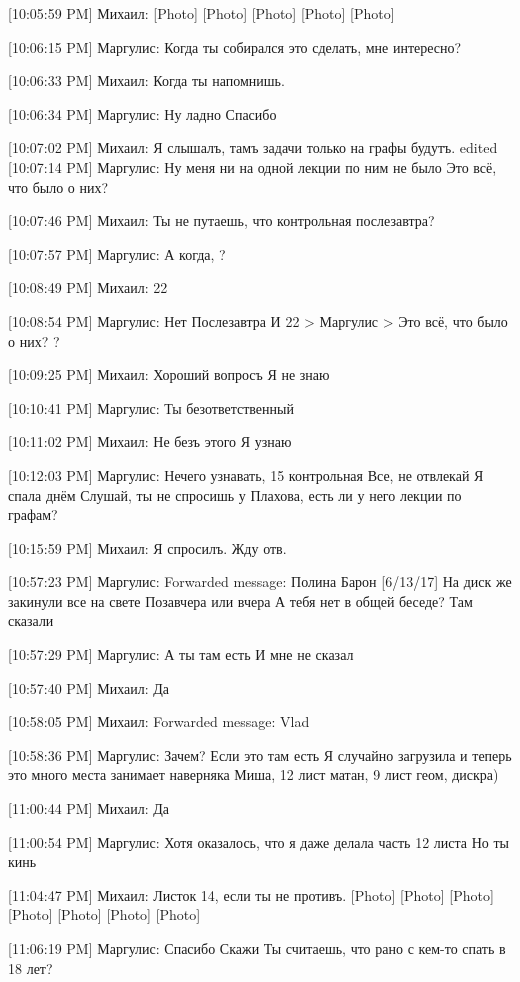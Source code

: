 \documentclass{article}
\newcommand{\yat}{{\fontencoding{X2}\selectfont\cyryat}} %
\begin{document}
[10:05:59 PM] Михаил:
[Photo]
 [Photo]
 [Photo]
 [Photo]
 [Photo]

[10:06:15 PM] Маргулис:
Когда ты собирался это сделать, мне интересно?

[10:06:33 PM] Михаил:
Когда ты напомнишь.

[10:06:34 PM] Маргулис:
Ну ладно
 Спасибо

[10:07:02 PM] Михаил:
Я слышалъ, тамъ задачи только на графы будутъ.
edited 
[10:07:14 PM] Маргулис:
Ну меня ни на одной лекции по ним не было
 Это всё, что было о них?

[10:07:46 PM] Михаил:
Ты не путаешь, что контрольная послезавтра?

[10:07:57 PM] Маргулис:
А когда,
 ?

[10:08:49 PM] Михаил:
22

[10:08:54 PM] Маргулис:
Нет
 Послезавтра
 И 22
> Маргулис
> Это всё, что было о них?
?

[10:09:25 PM] Михаил:
Хороший вопросъ
 Я не знаю

[10:10:41 PM] Маргулис:
Ты безответственный

[10:11:02 PM] Михаил:
Не безъ этого
 Я узнаю

[10:12:03 PM] Маргулис:
Нечего узнавать, 15 контрольная
 Все, не отвлекай
 Я спала днём
 Слушай, ты не спросишь у Плахова, есть ли у него лекции по графам?

[10:15:59 PM] Михаил:
Я спросилъ. Жду отв.

[10:57:23 PM] Маргулис:
Forwarded message: 
Полина Барон [6/13/17] 
На диск же закинули все на свете
Позавчера или вчера
А тебя нет в общей беседе? Там сказали

[10:57:29 PM] Маргулис:
А ты там есть
 И мне не сказал

[10:57:40 PM] Михаил:
Да

[10:58:05 PM] Михаил:
Forwarded message: 
Vlad

 
[10:58:36 PM] Маргулис:
Зачем? Если это там есть
 Я случайно загрузила и теперь это много места занимает наверняка
 Миша, 12 лист матан, 9 лист геом, дискра)

[11:00:44 PM] Михаил:
Да

[11:00:54 PM] Маргулис:
Хотя оказалось, что я даже делала часть 12 листа
 Но ты кинь

[11:04:47 PM] Михаил:
Листок 14, если ты не противъ.
 [Photo]
 [Photo]
 [Photo]
 [Photo]
 [Photo]
 [Photo]
 [Photo]

[11:06:19 PM] Маргулис:
Спасибо
 Скажи
 Ты считаешь, что рано с кем-то спать в 18 лет?
\end{document}
